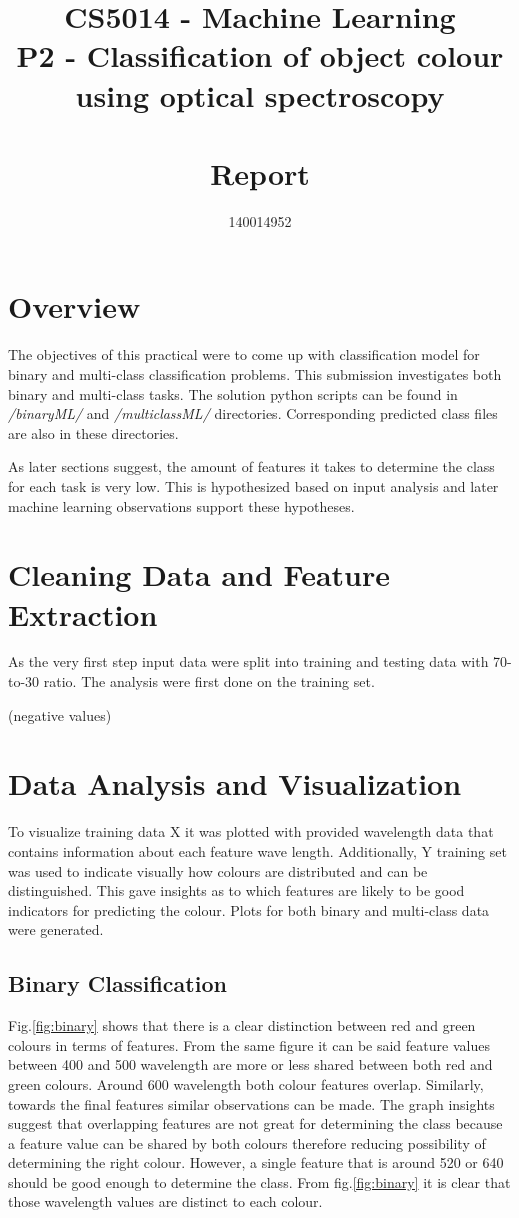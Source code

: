 \documentclass[11pt]{article}
\title{CS5014 - Machine Learning 
\\ \vspace{5mm} \Large P2 - Classification of object colour 
\\ using optical spectroscopy 
\\~\\ Report}
\author{140014952}
\begin{document}
	\maketitle

	\section{Overview}
		The objectives of this practical were to come up with classification model for binary and multi-class classification problems. This submission investigates both binary and multi-class tasks. The solution python scripts can be found in \textit{/binaryML/} and \textit{/multiclassML/} directories. Corresponding predicted class files are also in these directories.

		As later sections suggest, the amount of features it takes to determine the class for each task is very low. This is hypothesized based on input analysis and later machine learning observations support these hypotheses. 

	\section{Cleaning Data and Feature Extraction}
		As the very first step input data were split into training and testing data with 70-to-30 ratio. The analysis were first done on the training set. 

		(negative values)

	\section{Data Analysis and Visualization}
		To visualize training data X it was plotted with provided wavelength data that contains information about each feature wave length. Additionally, Y training set was used to indicate visually how colours are distributed and can be distinguished. This gave insights as to which features are likely to be good indicators for predicting the colour. Plots for both binary and multi-class data were generated. 

		\subsection{Binary Classification}
			Fig.\ref{fig:binary} shows that there is a clear distinction between red and green colours in terms of features. From the same figure it can be said feature values between 400 and 500 wavelength are more or less shared between both red and green colours. Around 600 wavelength both colour features overlap. Similarly, towards the final features similar observations can be made. The graph insights suggest that overlapping features are not great for determining the class because a feature value can be shared by both colours therefore reducing possibility of determining the right colour. However, a single feature that is around 520 or 640 should be good enough to determine the class. From fig.\ref{fig:binary} it is clear that those wavelength values are distinct to each colour.
\end{document}
